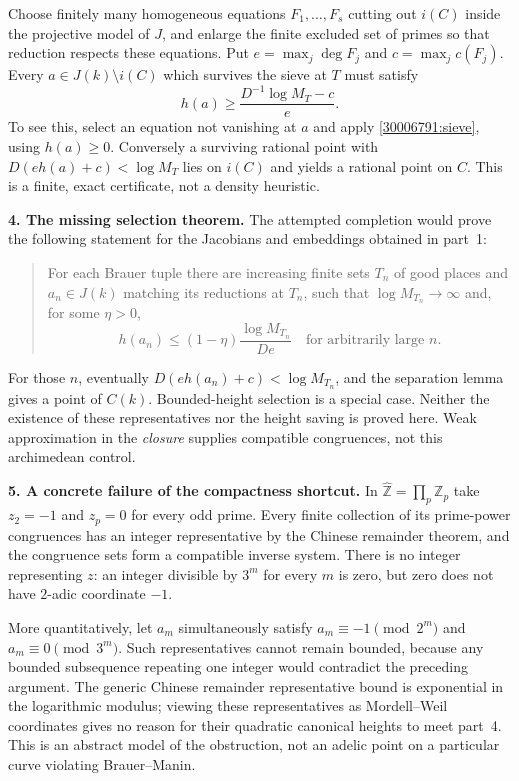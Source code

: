 \documentclass[11pt,a4paper]{article}
\newcommand{\Z}{\mathbb{Z}}
\begin{document}
Choose finitely many homogeneous equations $F_1,\ldots,F_s$ cutting out
$i(C)$ inside the projective model of $J$, and enlarge the finite excluded
set of primes so that reduction respects these equations. Put
$e=\max_j\deg F_j$ and $c=\max_jc(F_j)$. Every
$a\in J(k)\setminus i(C)$ which survives the sieve at $T$ must satisfy
\begin{equation}\label{30006791:separation}
 h(a)\ge\frac{D^{-1}\log M_T-c}{e}.
\end{equation}
To see this, select an equation not vanishing at $a$ and apply
\eqref{30006791:sieve}, using $h(a)\ge0$. Conversely a surviving rational point
with $D(eh(a)+c)<\log M_T$ lies on $i(C)$ and yields a rational point on
$C$. This is a finite, exact certificate, not a density heuristic.

\textbf{4. The missing selection theorem.}
The attempted completion would prove the following statement for the
Jacobians and embeddings obtained in part~1:
\begin{quote}\small
For each Brauer tuple there are increasing finite sets $T_n$ of good
places and $a_n\in J(k)$ matching its reductions at $T_n$, such that
$\log M_{T_n}\to\infty$ and, for some $\eta>0$,
\[
 h(a_n)\le(1-\eta)\frac{\log M_{T_n}}{De}
 \quad\text{for arbitrarily large }n.
\]
\end{quote}
For those $n$, eventually $D(eh(a_n)+c)<\log M_{T_n}$, and the separation
lemma gives a point of $C(k)$. Bounded-height selection is a special case.
Neither the existence of these representatives nor the height saving is
proved here. Weak approximation in the \emph{closure} supplies compatible
congruences, not this archimedean control.

\textbf{5. A concrete failure of the compactness shortcut.}
In $\widehat{\Z}=\prod_p\Z_p$ take $z_2=-1$ and $z_p=0$ for every odd prime.
Every finite collection of its prime-power congruences has an integer
representative by the Chinese remainder theorem, and the congruence sets
form a compatible inverse system. There is no integer representing $z$:
an integer divisible by $3^m$ for every $m$ is zero, but zero does not
have $2$-adic coordinate $-1$.

More quantitatively, let $a_m$ simultaneously satisfy
$a_m\equiv-1\pmod{2^m}$ and $a_m\equiv0\pmod{3^m}$. Such representatives
cannot remain bounded, because any bounded subsequence repeating one
integer would contradict the preceding argument. The generic Chinese
remainder representative bound is exponential in the logarithmic modulus;
viewing these representatives as Mordell--Weil coordinates gives no
reason for their quadratic canonical heights to meet part~4. This is an
abstract model of the obstruction, not an adelic point on a particular
curve violating Brauer--Manin.
\end{document}
